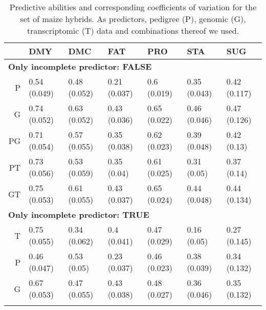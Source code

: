 \documentclass[12pt,titlepage]{article}
\begin{document}
\begin{table}[ht]
\centering
\caption{Predictive abilities and corresponding coefficients of variation for the set of maize hybrids. As predictors, pedigree (P), genomic (G), transcriptomic (T) data and combinations thereof we used.} 
\begin{tabular}{rllllll}
  \toprule
 & DMY & DMC & FAT & PRO & STA & SUG \\ 
  \midrule
\multicolumn{6}{l}{{\bfseries Only incomplete predictor: FALSE}}\\
P & 0.54 (0.049) & 0.48 (0.052) & 0.21 (0.037) & 0.6 (0.019) & 0.35 (0.043) & 0.42 (0.117) \\ 
  G & 0.74 (0.052) & 0.63 (0.052) & 0.43 (0.036) & 0.65 (0.022) & 0.46 (0.046) & 0.47 (0.126) \\ 
  PG & 0.71 (0.054) & 0.57 (0.055) & 0.35 (0.038) & 0.62 (0.023) & 0.39 (0.048) & 0.42 (0.13) \\ 
  PT & 0.73 (0.056) & 0.53 (0.059) & 0.35 (0.04) & 0.61 (0.025) & 0.31 (0.05) & 0.37 (0.14) \\ 
  GT & 0.75 (0.053) & 0.61 (0.055) & 0.43 (0.037) & 0.65 (0.024) & 0.44 (0.048) & 0.44 (0.134) \\ 
   \midrule
\multicolumn{6}{l}{{\bfseries Only incomplete predictor: TRUE}}\\
T & 0.75 (0.055) & 0.34 (0.062) & 0.4 (0.041) & 0.47 (0.029) & 0.16 (0.05) & 0.27 (0.145) \\ 
  P & 0.46 (0.047) & 0.53 (0.05) & 0.23 (0.037) & 0.46 (0.023) & 0.38 (0.039) & 0.34 (0.132) \\ 
  G & 0.67 (0.053) & 0.47 (0.055) & 0.43 (0.038) & 0.48 (0.027) & 0.36 (0.046) & 0.35 (0.132) \\ 
   \bottomrule
\multicolumn{6}{l}{}\\
\end{tabular}
\end{table}
\end{document}
